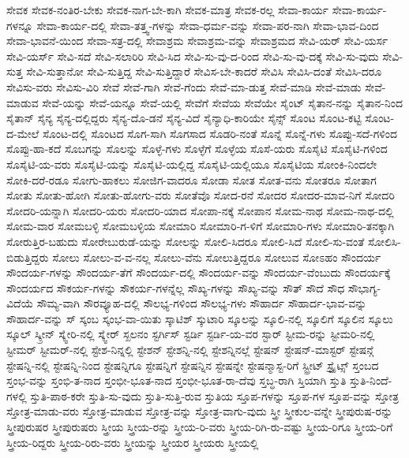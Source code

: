 {ಸೇವಕ
ಸೇವಕ-ನಂತಿರ-ಬೇಕು
ಸೇವಕ-ನಾಗ-ಬೇ-ಕಾಗಿ
ಸೇವಕ-ಮಾತ್ರ
ಸೇವಕ-ರಲ್ಲ
ಸೇವಾ-ಕಾರ್ಯ
ಸೇವಾ-ಕಾರ್ಯ-ಗಳನ್ನೂ
ಸೇವಾ-ಕಾರ್ಯ-ದಲ್ಲಿ
ಸೇವಾ-ತತ್ತ್ವ-ಗಳನ್ನು
ಸೇವಾ-ಧರ್ಮ-ವನ್ನು
ಸೇವಾ-ಪರ-ನಾಗಿ
ಸೇವಾ-ಭಾವ-ದಿಂದ
ಸೇವಾ-ಭಾವನೆ-ಯಿಂದ
ಸೇವಾ-ಸತ್ರ-ದಲ್ಲಿ
ಸೇವಾಶ್ರಮ
ಸೇವಾಶ್ರಮ-ವನ್ನು
ಸೇವಾಶ್ರಮದ
ಸೇವಿ-ಯರ್
ಸೇವಿ-ಯರ್ಸ
ಸೇವಿ-ಯರ್ಸ್
ಸೇವಿ-ಸದೆ
ಸೇವಿ-ಸಲಾರಿರಿ
ಸೇವಿ-ಸಿದ
ಸೇವಿ-ಸು-ವು-ದ-ರಿಂದ
ಸೇವಿ-ಸು-ವು-ದಕ್ಕೆ
ಸೇವಿ-ಸು-ವುದು
ಸೇವಿ-ಸುತ್ತ
ಸೇವಿ-ಸುತ್ತಾನೋ
ಸೇವಿ-ಸುತ್ತಿದ್ದ
ಸೇವಿ-ಸುತ್ತಿದ್ದಾರೆ
ಸೇವಿಸ-ಬೇ-ಕಾದರೆ
ಸೇವಿಸಿ
ಸೇವಿಸಿ-ದಂತೆ
ಸೇವಿಸಿ-ದರೂ
ಸೇವಿಸು-ವರು
ಸೇವಿಸು-ವಿರಿ
ಸೇವೆ
ಸೇವೆ-ಗಾಗಿ
ಸೇವೆ-ಗೆಂದು
ಸೇವೆ-ಮಾ-ಡುತ್ತ
ಸೇವೆ-ಮಾಡಿ
ಸೇವೆ-ಮಾಡು
ಸೇವೆ-ಮಾಡುವ
ಸೇವೆ-ಯನ್ನು
ಸೇವೆ-ಯನ್ನೂ
ಸೇವೆ-ಯಲ್ಲಿ
ಸೇವೆಗೆ
ಸೇವೆಯ
ಸೇವೆಯೇ
ಸೈಂಟ್
ಸೈತಾನ-ನನ್ನು
ಸೈತಾನ-ನಿಂದ
ಸೈತಾನ್
ಸೈನ್ಯ
ಸೈನ್ಯ-ದಲ್ಲಿದ್ದರು
ಸೈನ್ಯ-ದೊ-ಡನೆ
ಸೈನ್ಯ-ವಿದೆ
ಸೈನ್ಯಾಧಿ-ಕಾರಿಯೇ
ಸೈನ್ಸ್
ಸೊಂಟ
ಸೊಂಟ-ಕಟ್ಟಿ
ಸೊಂಟ-ದ-ಮೇಲೆ
ಸೊಂಟ-ದಲ್ಲಿ
ಸೊಂಟದ
ಸೊಗ-ಸಾಗಿ
ಸೊಗಸಾದ
ಸೊಡರಿ-ನಂತೆ
ಸೊನ್ನೆ
ಸೊನ್ನೆ-ಗಳು
ಸೊಪ್ಪು-ಸದೆ-ಗಳಿಂದ
ಸೊಪ್ಪು-ಹಾ-ಕದೆ
ಸೊಬಗನ್ನು
ಸೊಲನ್ನು
ಸೊಳ್ಳೆ-ಗಳು
ಸೊಳ್ಳೆಗೆ
ಸೊಳ್ಳೆಯ
ಸೊಸೆ-ಯರು
ಸೊಸೈಟಿ
ಸೊಸೈಟಿ-ಗಳಿಂದ
ಸೊಸೈಟಿ-ಯ-ವರು
ಸೊಸೈಟಿ-ಯನ್ನು
ಸೊಸೈಟಿ-ಯಲ್ಲಿದ್ದ
ಸೊಸೈಟಿ-ಯಲ್ಲಿಯೂ
ಸೊಸೈಟಿಯ
ಸೋಂಕಿ-ನಿಂದಲೇ
ಸೋಕಿ-ದರೆ-ರಡೂ
ಸೋಗು-ಹಾಕಲು
ಸೋಜಿಗ-ವಾದರೂ
ಸೋಡಾ
ಸೋತ
ಸೋತ-ವನು
ಸೋತರೂ
ಸೋತಾಗ
ಸೋತು
ಸೋತು-ಹೋಗಿ
ಸೋತು-ಹೋಗು-ವರು
ಸೋತೆವೊ
ಸೋದ-ರನೆ
ಸೋದರ
ಸೋದರ-ಮಾವ-ನಿಗೆ
ಸೋದರಿ
ಸೋದರಿ-ಯನ್ನಾಗಿ
ಸೋದರಿ-ಯರು
ಸೋದರಿ-ಯಾದ
ಸೋಪಾ-ನಕ್ಕೆ
ಸೋಪಾನ
ಸೋಮ-ನಾಥ
ಸೋಮ-ನಾಥ-ದಲ್ಲಿ
ಸೋಮ-ವಾರ
ಸೋಮಬಳ್ಳಿ
ಸೋಮಬಳ್ಳಿಯ
ಸೋಮಾರಿ
ಸೋಮಾರಿ-ಗ-ಳಿಗೆ
ಸೋಮಾರಿ-ಗಳು
ಸೋಮಾರಿ-ತನಕ್ಕಾಗಿ
ಸೋರುತ್ತಿರ-ಬಹುದು
ಸೋರೇಬುರುಡೆ-ಯನ್ನು
ಸೋಲನ್ನು
ಸೋಲಿ-ಸಿದರೂ
ಸೋಲಿ-ಸಿದೆ
ಸೋಲಿ-ಸು-ವಂತೆ
ಸೋಲಿಸಿ-ಬಿಡುತ್ತಿದ್ದರು
ಸೋಲು
ಸೋಲು-ವ-ವ-ನಲ್ಲ
ಸೋಲು-ವೆನು
ಸೋಲುತ್ತಿದ್ದರೂ
ಸೋಲುವ
ಸೋಽಹಂ
ಸೌಂದರ್ಯ
ಸೌಂದರ್ಯ-ಗಳನ್ನು
ಸೌಂದರ್ಯ-ತೆಗೆ
ಸೌಂದರ್ಯ-ದಲ್ಲಿ
ಸೌಂದರ್ಯ-ವನ್ನು
ಸೌಂದರ್ಯ-ವೆಂಬುದು
ಸೌಂದರ್ಯಕ್ಕೆ
ಸೌಂದರ್ಯದ
ಸೌಕರ್ಯ-ಗಳನ್ನು
ಸೌಕರ್ಯ-ಗಳನ್ನೆಲ್ಲ
ಸೌಖ್ಯ-ಗಳನ್ನು
ಸೌಖ್ಯ-ವನ್ನು
ಸೌತ್
ಸೌದೆ
ಸೌಧ
ಸೌಭಾಗ್ಯ-ವಿದೆಯೆ
ಸೌಮ್ಯ-ವಾಗಿ
ಸೌರವ್ಯೂಹ-ದಲ್ಲಿ
ಸೌಲಭ್ಯ-ಗಳಿಂದ
ಸೌಲಭ್ಯ-ಗಳು
ಸೌಹಾರ್ದ
ಸೌಹಾರ್ದ-ಭಾವ-ವನ್ನು
ಸೌಹಾರ್ದ-ವನ್ನು
ಸ್
ಸ್ಕಂಬ
ಸ್ಕಂಭ-ವಾ-ಯಿತು
ಸ್ಕಾಟಿಶ್
ಸ್ಕುಟಾರಿ
ಸ್ಕೂಲನ್ನು
ಸ್ಕೂಲಿ-ನಲ್ಲಿ
ಸ್ಕೂಲಿಗೆ
ಸ್ಕೂಲಿನ
ಸ್ಕೂಲು
ಸ್ಕೂಲ್
ಸ್ಕ್ರೀನ್
ಸ್ಕ್ವೇರಿ-ನಲ್ಲಿ
ಸ್ಕ್ವೇರ್
ಸ್ಖಲನಂ
ಸ್ಟರ್ಗಿಸ್
ಸ್ಟರ್ಡಿ
ಸ್ಟರ್ಡಿ-ಯ-ವರ
ಸ್ಟಾರ್
ಸ್ಟೀಮ-ರನ್ನು
ಸ್ಟೀಮರಿ-ನಲ್ಲಿ
ಸ್ಟೀಮರ್
ಸ್ಟೀಮರ್-ನಲ್ಲಿ
ಸ್ಟೇಶ-ನಿನ್ನಲ್ಲಿ
ಸ್ಟೇಶನ್
ಸ್ಟೇಶನ್ನಿ-ನಲ್ಲಿ
ಸ್ಟೇಶನ್ನಿನಲ್ಲೆ
ಸ್ಟೇಷನ್
ಸ್ಟೇಷನ್-ಮಾಸ್ಟರ್
ಸ್ಟೇಷನ್ಗೆ
ಸ್ಟೇಷನ್ನಿ-ನಲ್ಲಿ
ಸ್ಟೇಷನ್ನಿ-ನಿಂದ
ಸ್ಟೇಷನ್ನಿಗೂ
ಸ್ಟೇಷನ್ನಿಗೆ
ಸ್ಟೇಷನ್ನಿನ
ಸ್ಟೇಷನ್ನೇ
ಸ್ಟೇಷನ್ಮಾಸ್ಟ-ರಿಗೆ
ಸ್ಟ್ರೀಟ್
ಸ್ಟ್ರೈಟ್ಸ್
ಸ್ತಂಬದ
ಸ್ತಂಭ-ವನ್ನು
ಸ್ತಂಭಿ-ತ-ನಾದ
ಸ್ತಂಭೀ-ಭೂತ-ನಾದ
ಸ್ತಂಭೀ-ಭೂತ-ರಾ-ದೆವು
ಸ್ತಬ್ಧ-ರಾಗಿ
ಸ್ತಿಯಾಗಿ
ಸ್ತುತಿ
ಸ್ತುತಿ-ನಿಂದೆ-ಗಳಲ್ಲಿ
ಸ್ತುತಿ-ಪಾಠ-ಕರೇ
ಸ್ತುತಿ-ಸು-ವುದು
ಸ್ತುತಿ-ಸುತ್ತಿ-ರುವ
ಸ್ತುತಿಯ
ಸ್ತೂಪ-ಗಳನ್ನು
ಸ್ತೂಪ-ಗಳ
ಸ್ತೂಪ-ವನ್ನು
ಸ್ತೋತ್ರ
ಸ್ತೋತ್ರ-ಮಾಡು-ವರು
ಸ್ತೋತ್ರ-ಮಾಡುವ
ಸ್ತೋತ್ರ-ವನ್ನು
ಸ್ತೋತ್ರ-ವಾಗು-ವುದು
ಸ್ತ್ರೀ
ಸ್ತ್ರೀಕುಲ-ವನ್ನೇ
ಸ್ತ್ರೀಪುರುಷ-ರನ್ನು
ಸ್ತ್ರೀಪುರುಷರ
ಸ್ತ್ರೀಪುರುಷರು
ಸ್ತ್ರೀಯ
ಸ್ತ್ರೀಯ-ರನ್ನು
ಸ್ತ್ರೀಯ-ರಿ-ವರು
ಸ್ತ್ರೀಯ-ರಿಗಿ-ರು-ವಷ್ಟು
ಸ್ತ್ರೀಯ-ರಿಗೂ
ಸ್ತ್ರೀಯ-ರಿಗೆ
ಸ್ತ್ರೀಯ-ರಿದ್ದರು
ಸ್ತ್ರೀಯ-ರಿರು-ವರು
ಸ್ತ್ರೀಯನ್ನು
ಸ್ತ್ರೀಯರ
ಸ್ತ್ರೀಯರು
ಸ್ತ್ರೀಯಲ್ಲಿ
}
